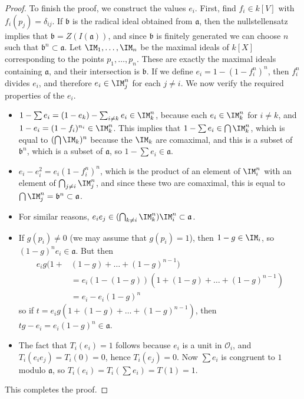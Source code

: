 \begin{proof}
    To finish the proof, we construct the values $e_i$. First, find $f_i \in k[V]$ with $f_i(p_j) = \delta_{ij}$. If $\mathfrak{b}$ is the radical ideal obtained from $\mathfrak{a}$, then the nullstellensatz implies that $\mathfrak{b} = Z(I(\mathfrak{a}))$, and since $\mathfrak{b}$ is finitely generated we can choose $n$ such that $\mathfrak{b}^n \subset \mathfrak{a}$. Let $\IM_1, \dots, \IM_n$ be the maximal ideals of $k[X]$ corresponding to the points $p_1, \dots, p_n$. These are exactly the maximal ideals containing $\mathfrak{a}$, and their intersection is $\mathfrak{b}$. If we define $e_i = 1 - (1 - f_i^n)^n$, then $f_i^n$ divides $e_i$, and therefore $e_i \in \IM_j^n$ for each $j \neq i$. We now verify the required properties of the $e_i$.
    \begin{itemize}
        \item $1 - \sum e_i = (1 - e_k) - \sum_{i \neq k} e_i \in \IM_k^n$, because each $e_i \in \IM_k^n$ for $i \neq k$, and $1 - e_i = (1 - f_i)^{n_i} \in \IM_k^n$. This implies that $1 - \sum e_i \in \bigcap \IM_k^n$, which is equal to $(\bigcap \IM_k)^n$ because the $\IM_k$ are comaximal, and this is a subset of $\mathfrak{b}^n$, which is a subset of $\mathfrak{a}$, so $1 - \sum e_i \in \mathfrak{a}$.

        \item $e_i - e_i^2 = e_i(1 - f_i^n)^n$, which is the product of an element of $\IM_i^n$ with an element of $\bigcap_{j \neq i} \IM_j^n$, and since these two are comaximal, this is equal to $\bigcap \IM_j^n = \mathfrak{b}^n \subset \mathfrak{a}$.

        \item For similar reasons, $e_ie_j \in (\bigcap_{k \neq i} \IM_k^n) \IM_i^n \subset \mathfrak{a}$.

        \item  If $g(p_i) \neq 0$ (we may assume that $g(p_i) = 1$), then $1 - g \in \IM_i$, so $(1-g)^n e_i \in \mathfrak{a}$. But then
    \begin{align*}
        e_i g(1 +& (1-g) + \dots + (1-g)^{n-1})\\
        &= e_i(1 - (1-g))(1 + (1-g) + \dots + (1-g)^{n-1})\\
        &= e_i - e_i (1 - g)^n
    \end{align*}
    so if $t = e_i g(1 + (1-g) + \dots + (1-g)^{n-1})$, then $tg - e_i = e_i(1-g)^n \in \mathfrak{a}$.

    \item The fact that $T_i(e_i) = 1$ follows because $e_i$ is a unit in $\mathcal{O}_i$, and $T_i(e_ie_j) = T_i(0) = 0$, hence $T_i(e_j) = 0$. Now $\sum e_i$ is congruent to $1$ modulo $\mathfrak{a}$, so $T_i(e_i) = T_i(\sum e_i) = T(1) = 1$.
    \end{itemize}
    This completes the proof.
\end{proof}

